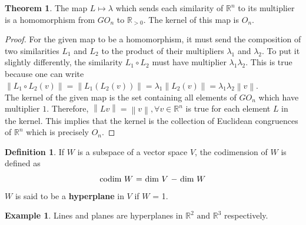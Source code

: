 \documentclass[11pt]{report}
\theoremstyle{plain}
\theoremstyle{definition}
\newtheorem{defn}{Definition}
\newtheorem{exmp}{Example} %
\newtheorem{theorem}{Theorem}
\begin{document}
\begin{theorem}
	The map $ L \mapsto \lambda $ which sends each similarity of $ \mathbb{R}^n $ to its multiplier is a homomorphism from $ GO_n $ to $ \mathbb{R}_{>0} $. The kernel of this map is $ O_n $.\\
\end{theorem}
	\begin{proof}
		For the given map to be a homomorphism, it must send the composition of two similarities $ L_1 $ and $ L_2 $ to the product of their multipliers $ \lambda_1 $ and $ \lambda_2 $. To put it slightly differently, the similarity $ L_1 \circ L_2 $ must have multiplier $ \lambda_1 \lambda_2 $. This is true because one can write $ \left\| L_1\circ L_2(v)\right\| = \left\| L_1(L_2(v))\right\| = \lambda_1\left\|L_2(v) \right\| = \lambda_1 \lambda_2 \left\|v \right\|.   $\\
		 
		The kernel of the given map is the set containing all elements of $ GO_n $ which have multiplier $ 1 $. Therefore, $ \left\|Lv \right\|  = \left\|v \right\| ,\forall v \in \mathbb{R}^n$ is true for each element $ L $ in the kernel. This implies that the kernel is the collection of Euclidean congruences of $ \mathbb{R}^n $ which is precisely $ O_n $.
		
	\end{proof}






\begin{defn}
	If $ W $ is a subspace of a vector space $ V$, the codimension of $ W $ is defined as 
	$$\text{codim  $ W $ = dim  $ V $ $ - $ dim  $ W $}  $$ $ W $ is said to be a \textbf{hyperplane} in $ V $ if   $ W $ = 1.
\end{defn}

 \begin{exmp}
	Lines and planes are hyperplanes in $ \mathbb{R}^2 \text{ and } \mathbb{R}^3 $ respectively.
 \end{exmp}
\end{document}
